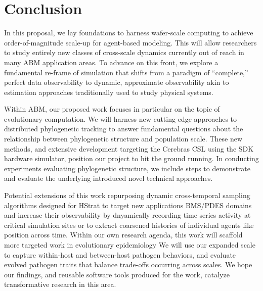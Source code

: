 \section{Conclusion} \label{sec:conclusion}

In this proposal, we lay foundations to harness wafer-scale computing to achieve order-of-magnitude scale-up for agent-based modeling.
This will allow researchers to study entirely new classes of cross-scale dynamics currently out of reach in many ABM application areas.
To advance on this front, we explore a fundamental re-frame of simulation that shifts from a paradigm of ``complete,'' perfect data observability to dynamic, approximate observability akin to estimation approaches traditionally used to study physical systems.

Within ABM, our proposed work focuses in particular on the topic of evolutionary computation.
We will harness new cutting-edge approaches to distributed phylogenetic tracking to answer fundamental questions about the relationship between phylogenetic structure and population scale.
These new methods, and extensive development targeting the Cerebras CSL using the SDK hardware simulator, position our project to hit the ground running.
In conducting experiments evaluating phylogenetic structure, we include steps to demonstrate and evaluate the underlying introduced novel technical approaches.

Potential extensions of this work repurposing dynamic cross-temporal sampling algorithms designed for HStrat to target new applications BMS/PDES domains and increase their observability by dnyamically recording time series activity at critical simulation sites or to extract coarsened histories of individual agents like position across time.
Within our own research agenda, this work will scaffold more targeted work in evolutionary epidemiology We will use our expanded scale to capture within-host and between-host pathogen behaviors, and evaluate evolved pathogen traits that balance trade-offs occurring across scales.
We hope our findings, and reusable software tools produced for the work, catalyze transformative research in this area.
